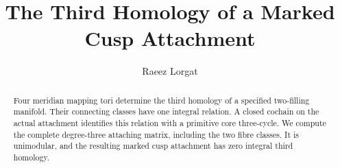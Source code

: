 \documentclass[11pt]{article}
\title{The Third Homology of a Marked Cusp Attachment}
\author{Raeez Lorgat}
\date{}
\numberwithin{equation}{section}
\begin{document}
\maketitle
\begin{abstract}
Four meridian mapping tori determine the third homology of a specified
two-filling manifold. Their connecting classes have one integral relation.
A closed cochain on the actual attachment identifies this relation with
a primitive core three-cycle. We compute the complete degree-three
attaching matrix, including the two fibre classes.
It is unimodular, and the resulting marked cusp attachment has zero
integral third homology.
\end{abstract}

\end{document}
